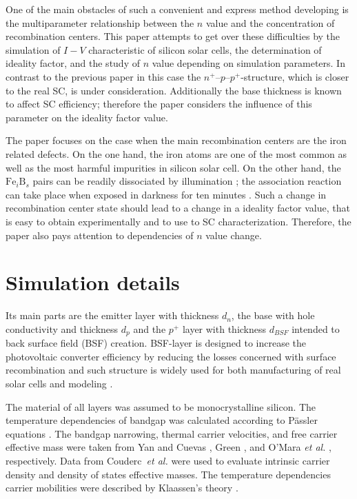 One of the main obstacles of such a convenient and express method developing is the multiparameter relationship between
the $n$ value and the concentration of recombination centers.
This paper attempts to get over these difficulties by the simulation of $I-V$ characteristic of silicon solar cells,
the determination of ideality factor, and the study of  $n$ value depending on simulation parameters.
In contrast to the previous paper \cite{Olikh2019SM} in this case the $n^+$--$p$--$p^+$-structure,
which is closer to the real SC, is under consideration.
Additionally the base thickness is known \cite{Sach_d,FeB:Schmidt} to affect SC efficiency;
therefore the paper considers the influence of this parameter on the ideality factor value.

The paper focuses on the case when the main recombination centers are the iron related defects.
On the one hand, the iron atoms  are one of the most common as well as the most harmful impurities in silicon solar cell.
On the other hand, the $\mathrm{Fe}_i\mathrm{B}_s$ pairs can be readily dissociated by illumination \cite{FeB:Schmidt};
the association reaction can take place when exposed in darkness for ten minutes \cite{FeB:kinetic}.
Such a change in recombination center state should lead to a change in a ideality factor value,
that is easy to obtain experimentally and to use to SC characterization.
Therefore, the paper also pays attention to dependencies of $n$ value change.

\section{Simulation details}


Its main parts are the emitter layer with thickness $d_n$, the base with hole conductivity and thickness $d_p$
and the $p^+$ layer with thickness $d_{BSF}$ intended to back surface field (BSF) creation.
BSF-layer is designed to increase the photovoltaic converter efficiency by reducing the losses concerned with surface recombination
and such structure is widely used for both manufacturing of real solar cells and modeling \cite{SCAPSuseSi4,SCAPSuseSi1,SCAPSuseSi5}.

The material of all layers was assumed to be monocrystalline silicon.
The temperature dependencies of bandgap was calculated according to P\"assler equations \cite{Pasler}.
The bandgap narrowing, thermal carrier velocities,
and  free carrier effective mass
were taken from Yan and Cuevas \cite{EgNarrow}, Green \cite{Nc:Green}, and O'Mara \emph{et al.} \cite{OMara}, respectively.
Data from Couderc~\emph{et al.} \cite{Si_ni_Couderc} were used to evaluate intrinsic carrier density and density of states effective masses.
The temperature dependencies carrier mobilities were described by Klaassen's theory \cite{KLAASSEN953,Hull}.

